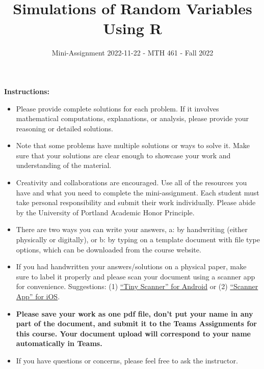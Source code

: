 \documentclass[
]{article}
\title{\textbf{Simulations of Random Variables Using R}}
\subtitle{Mini-Assignment 2022-11-22 - MTH 461 - Fall 2022}
\author{}
\date{\vspace{-2.5em}}
\begin{document}
\maketitle

\hfill\break

\textbf{Instructions:}

\begin{itemize}
\item
  Please provide complete solutions for each problem. If it involves mathematical computations, explanations, or analysis, please provide your reasoning or detailed solutions.
\item
  Note that some problems have multiple solutions or ways to solve it. Make sure that your solutions are clear enough to showcase your work and understanding of the material.
\item
  Creativity and collaborations are encouraged. Use all of the resources you have and what you need to complete the mini-assignment. Each student must take personal responsibility and submit their work individually. Please abide by the University of Portland Academic Honor Principle.
\item
  There are two ways you can write your answers, a: by handwriting (either physically or digitally), or b: by typing on a template document with file type options, which can be downloaded from the course website.
\item
  If you had handwritten your answers/solutions on a physical paper, make sure to label it properly and please scan your document using a scanner app for convenience. Suggestions: (1) \href{https://play.google.com/store/apps/details?id=com.appxy.tinyscanner\&hl=en_US\&gl=US}{``Tiny Scanner'' for Android} or (2) \href{https://apps.apple.com/us/app/scanner-app-scan-pdf-document/id595563753}{``Scanner App'' for iOS}.
\item
  \textbf{Please save your work as one pdf file, don't put your name in any part of the document, and submit it to the Teams Assignments for this course. Your document upload will correspond to your name automatically in Teams.}
\item
  If you have questions or concerns, please feel free to ask the instructor.
\end{itemize}

\newpage
\end{document}
